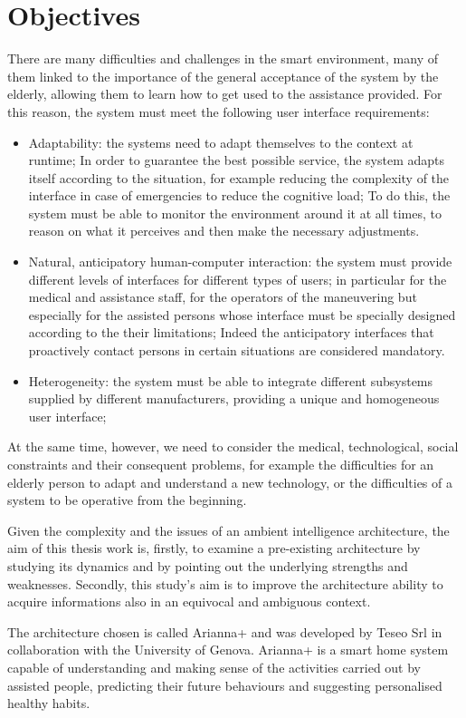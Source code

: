 \documentclass{thesisreport}
\begin{document}
 \section{Objectives}
 There are many difficulties and challenges in the smart environment, many of them linked to the importance of the general acceptance of the system by the elderly, allowing them to learn how to get used to the assistance provided. For this reason, the system must meet the following user interface requirements:
 \begin{itemize}
     \item Adaptability:  the systems need to adapt themselves to the context at runtime;
     In order to guarantee the best possible service, the system adapts itself according to the situation, for example reducing the complexity of the interface in case of emergencies to reduce the cognitive load;
     To do this, the system must be able to monitor the environment around it at all times, to reason on what it perceives and then make the necessary adjustments.
     \item  Natural, anticipatory human-computer interaction: the system must provide different levels of interfaces for different types of users; in particular for the medical and assistance staff, for the operators of the maneuvering but especially for the assisted persons whose interface must be specially designed according to the their limitations; 
     Indeed the anticipatory interfaces that proactively contact persons in certain situations are considered mandatory.
     \item Heterogeneity: the system must be able to integrate different subsystems supplied by different manufacturers, providing a unique and homogeneous user interface;
 \end{itemize}
 At the same time, however, we need to consider the medical, technological, social constraints and their consequent problems, for example the difficulties for an elderly person to adapt and understand a new technology, or the difficulties of a system to be operative from the beginning.
 
 Given the complexity and the issues of an ambient intelligence architecture, the aim of this thesis work is, firstly, to examine a pre-existing architecture by studying its dynamics and by pointing out the underlying strengths and weaknesses. Secondly, this study’s aim is to improve the architecture ability to acquire informations also in an equivocal and ambiguous context.
 
 The architecture chosen is called Arianna+ and was developed by Teseo Srl in collaboration with the University of Genova. Arianna+ is a smart home system capable of understanding and making sense of the activities carried out by assisted people, predicting their future behaviours and suggesting personalised healthy habits.
 
\end{document}
